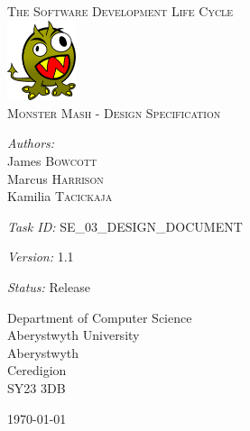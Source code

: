 \documentclass[a4paper]{article}
\begin{document}
\pagestyle{fancy}
\begin{center}
\textsc{\LARGE The Software Development Life Cycle}\\[1.5cm]\includegraphics[width=0.15\textwidth]{img/monster.png}\\[1.5cm] %
\textsc{\Large Monster Mash - Design Specification}\\[0.5cm] %

\begin{minipage}{0.8\textwidth}
\begin{flushleft} \large
\emph{Authors:}\\
James \textsc{Bowcott}\\
Marcus \textsc{Harrison}\\
Kamilia \textsc{Tacickaja}\\
\end{flushleft}
\end{minipage}
\vspace{8 mm}

\begin{minipage}{0.8\textwidth}
\begin{flushleft} \large
\emph{Task ID:}
SE\_03\_DESIGN\_DOCUMENT
\end{flushleft}
\end{minipage}
\vspace{8 mm}

\begin{minipage}{0.8\textwidth}
\begin{flushleft} \large
\emph{Version:}
1.1
\end{flushleft}
\end{minipage}
\vspace{8 mm}

\begin{minipage}{0.8\textwidth}
\begin{flushleft} \large
\emph{Status:}
Release
\end{flushleft}
\end{minipage}
\vspace{8 mm}

\begin{minipage}{0.8\textwidth}
\begin{flushleft} \large
Department of Computer Science\\
Aberystwyth University\\
Aberystwyth\\
Ceredigion\\
SY23 3DB\\
\end{flushleft}
\end{minipage}
\vfill
{\large \today}
\end{center}
\end{document}
